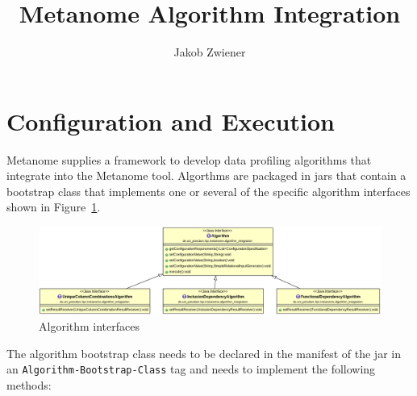 \documentclass[10pt,a4paper]{article}
\author{Jakob Zwiener}
\title{Metanome Algorithm Integration}
\begin{document}
\maketitle

\section{Configuration and Execution}
\label{sec_ConfigurationAndExecution}

Metanome supplies a framework to develop data profiling algorithms that integrate into the Metanome tool. Algorthms are packaged in jars that contain a bootstrap class that implements one or several of the specific algorithm interfaces shown in Figure~\ref{fig_algorithmClass}.
\begin{figure}[h]
\includegraphics[width=\textwidth]{algorithm_class}
\caption{Algorithm interfaces}
\label{fig_algorithmClass}
\end{figure}
The algorithm bootstrap class needs to be declared in the manifest of the jar in an \texttt{Algorithm-Bootstrap-Class} tag and needs to implement the following methods:
\end{document}
